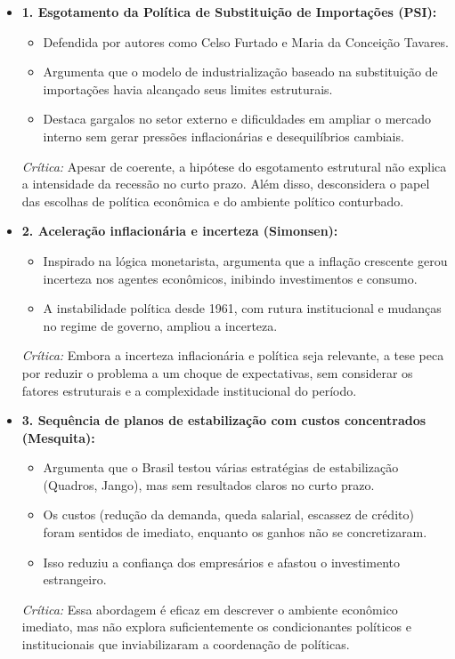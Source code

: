 \documentclass[a4paper,12pt]{article}[abntex2]
\begin{document}
\begin{itemize}
    \item \textbf{1. Esgotamento da Política de Substituição de Importações (PSI):}
    \begin{itemize}
        \item Defendida por autores como Celso Furtado e Maria da Conceição Tavares.
        \item Argumenta que o modelo de industrialização baseado na substituição de importações havia alcançado seus limites estruturais.
        \item Destaca gargalos no setor externo e dificuldades em ampliar o mercado interno sem gerar pressões inflacionárias e desequilíbrios cambiais.
    \end{itemize}
    \textit{Crítica:} Apesar de coerente, a hipótese do esgotamento estrutural não explica a intensidade da recessão no curto prazo. Além disso, desconsidera o papel das escolhas de política econômica e do ambiente político conturbado.

    \item \textbf{2. Aceleração inflacionária e incerteza (Simonsen):}
    \begin{itemize}
        \item Inspirado na lógica monetarista, argumenta que a inflação crescente gerou incerteza nos agentes econômicos, inibindo investimentos e consumo.
        \item A instabilidade política desde 1961, com rutura institucional e mudanças no regime de governo, ampliou a incerteza.
    \end{itemize}
    \textit{Crítica:} Embora a incerteza inflacionária e política seja relevante, a tese peca por reduzir o problema a um choque de expectativas, sem considerar os fatores estruturais e a complexidade institucional do período.

    \item \textbf{3. Sequência de planos de estabilização com custos concentrados (Mesquita):}
    \begin{itemize}
        \item Argumenta que o Brasil testou várias estratégias de estabilização (Quadros, Jango), mas sem resultados claros no curto prazo.
        \item Os custos (redução da demanda, queda salarial, escassez de crédito) foram sentidos de imediato, enquanto os ganhos não se concretizaram.
        \item Isso reduziu a confiança dos empresários e afastou o investimento estrangeiro.
    \end{itemize}
    \textit{Crítica:} Essa abordagem é eficaz em descrever o ambiente econômico imediato, mas não explora suficientemente os condicionantes políticos e institucionais que inviabilizaram a coordenação de políticas.


\end{itemize}
\end{document}
